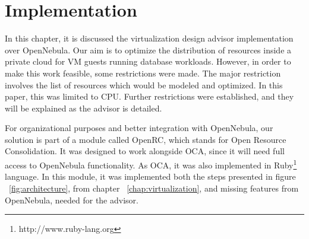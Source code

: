 \chapter{\textbf{Implementation}}

\label{chap:implementation}

In this chapter, it is discussed the virtualization design advisor implementation over OpenNebula. Our aim is to optimize the distribution of resources inside a private cloud for VM guests running database workloads. However, in order to make this work feasible, some restrictions were made. The major restriction involves the list of resources which would be modeled and optimized. In this paper, this was limited to CPU. Further restrictions were established, and they will be explained as the advisor is detailed.

For organizational purposes and better integration with OpenNebula, our solution  is part of a module called OpenRC, which stands for Open Resource Consolidation. It was designed to work alongside OCA, since it will need full access to OpenNebula functionality. As OCA, it was also implemented in Ruby\footnote{http://www.ruby-lang.org} language. In this module, it was implemented both the steps presented in figure ~\ref{fig:architecture}, from chapter ~\ref{chap:virtualization}, and missing features from OpenNebula, needed for the advisor.

